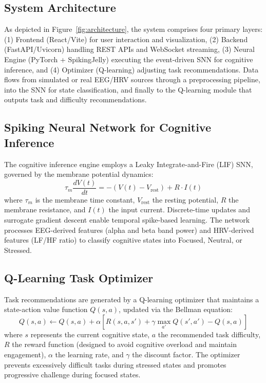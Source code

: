 \documentclass[conference]{IEEEtran}
\begin{document}
\subsection{System Architecture}
As depicted in Figure~\ref{fig:architecture}, the system comprises four primary layers: (1) Frontend (React/Vite) for user interaction and visualization, (2) Backend (FastAPI/Uvicorn) handling REST APIs and WebSocket streaming, (3) Neural Engine (PyTorch + SpikingJelly) executing the event-driven SNN for cognitive inference, and (4) Optimizer (Q-learning) adjusting task recommendations. Data flows from simulated or real EEG/HRV sources through a preprocessing pipeline, into the SNN for state classification, and finally to the Q-learning module that outputs task and difficulty recommendations.

\subsection{Spiking Neural Network for Cognitive Inference}
The cognitive inference engine employs a Leaky Integrate-and-Fire (LIF) SNN, governed by the membrane potential dynamics:
\begin{equation}
\tau_m \frac{dV(t)}{dt} = -(V(t) - V_{\text{rest}}) + R \cdot I(t)
\end{equation}
where $\tau_m$ is the membrane time constant, $V_{\text{rest}}$ the resting potential, $R$ the membrane resistance, and $I(t)$ the input current. Discrete-time updates and surrogate gradient descent enable temporal spike-based learning. The network processes EEG-derived features (alpha and beta band power) and HRV-derived features (LF/HF ratio) to classify cognitive states into Focused, Neutral, or Stressed.

\subsection{Q-Learning Task Optimizer}
Task recommendations are generated by a Q-learning optimizer that maintains a state-action value function $Q(s, a)$, updated via the Bellman equation:
\begin{equation}
Q(s, a) \leftarrow Q(s, a) + \alpha \left[ R(s, a, s') + \gamma \max_{a'} Q(s', a') - Q(s, a) \right]
\end{equation}
where $s$ represents the current cognitive state, $a$ the recommended task difficulty, $R$ the reward function (designed to avoid cognitive overload and maintain engagement), $\alpha$ the learning rate, and $\gamma$ the discount factor. The optimizer prevents excessively difficult tasks during stressed states and promotes progressive challenge during focused states.
\end{document}

